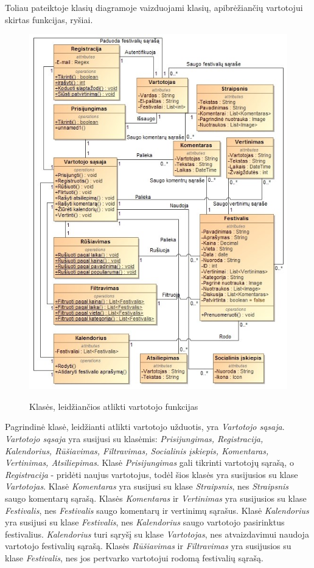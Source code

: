 ﻿\documentclass{VUMIFPSkursinis}
\begin{document}
Toliau pateiktoje klasių diagramoje vaizduojami klasių, apibrėžiančių vartotojui skirtas funkcijas, ryšiai.
\begin{figure}[H]
\centering
    \includegraphics[scale=0.65]{img/PSI3/user}
	\label{uml:21}
	\caption{Klasės, leidžiančios atlikti vartotojo funkcijas}
\end{figure}
Pagrindinė klasė, leidžianti atlikti vartotojo užduotis, yra \textit{Vartotojo sąsaja}. \textit{Vartotojo sąsaja} yra susijusi su klasėmis: \textit{Prisijungimas, Registracija, Kalendorius, Rūšiavimas, Filtravimas, Socialinis įskiepis, Komentaras, Vertinimas, Atsiliepimas}. Klasė \textit{Prisijungimas} gali tikrinti vartotojų sąrašą, o \textit{Registracija} - pridėti naujus vartotojus, todėl šios klasės yra susijusios su klase \textit{Vartotojas}. Klasė \textit{Komentaras} yra susijusi su klase \textit{Straipsnis}, nes \textit{Straipsnis} saugo komentarų sąrašą. Klasės \textit{Komentaras} ir \textit{Vertinimas} yra susijusios su klase \textit{Festivalis}, nes \textit{Festivalis} saugo komentarų ir vertinimų sąrašus. Klasė \textit{Kalendorius} yra susijusi su klase \textit{Festivalis}, nes \textit{Kalendorius} saugo vartotojo pasirinktus festivalius. \textit{Kalendorius} turi sąryšį su klase \textit{Vartotojas}, nes atvaizdavimui naudoja vartotojo festivalių sąrašą. Klasės \textit{Rūšiavimas} ir \textit{Filtravimas} yra susijusios su klase \textit{Festivalis}, nes jos pertvarko vartotojui rodomą festivalių sąrašą.
\end{document}
